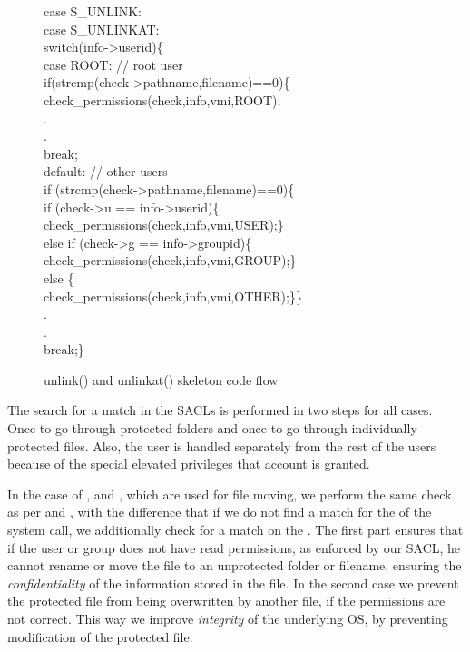 \begin{figure}[ht]
\footnotesize {
	{\selectfont 
\tab case S\_UNLINK:\\          
\tab case S\_UNLINKAT:\\
\tab \tab  switch(info->userid)\{\\
\tab \tab \tab case ROOT: // root user\\
\tab \tab \tab \tab 	if(strcmp(check->pathname,filename)==0)\{\\
\tab \tab \tab \tab \tab 		check\_permissions(check,info,vmi,ROOT);\\			
\tab \tab .\\
\tab \tab .\\
\tab \tab \tab \tab break;\\
\tab \tab \tab default: // other users\\
\tab \tab \tab \tab if (strcmp(check->pathname,filename)==0)\{\\
\tab \tab \tab \tab \tab if (check->u == info->userid)\{\\
\tab \tab \tab \tab \tab \tab check\_permissions(check,info,vmi,USER);\}\\
\tab \tab \tab \tab \tab else if (check->g == info->groupid)\{\\
\tab \tab \tab \tab \tab \tab check\_permissions(check,info,vmi,GROUP);\}\\
\tab \tab \tab \tab else \{\\
\tab \tab \tab \tab \tab check\_permissions(check,info,vmi,OTHER);\}\}\\
\tab \tab .\\
\tab \tab .\\
\tab \tab \tab \tab break;\}}}
	\caption{unlink() and unlinkat() skeleton code flow}
	\label{fig:unlink}
\end{figure}

\par The search for a match in the \ac{SACL}s is performed in two steps for all cases. Once to go through protected folders and once to go through individually protected files. Also, the  user is handled separately from the rest of the users because of the special elevated privileges that account is granted. 

\par In the case of ,  and , which are used for file moving, we perform the same check as per  and , with the difference that if we do not find a match for the  of the system call, we additionally check for a match on the . The first part ensures that if the user or group does not have read permissions, as enforced by our \ac{SACL}, he cannot rename or move the file to an unprotected folder or filename, ensuring the \emph{confidentiality} of the information stored in the file. In the second case we prevent the protected file from being overwritten by another file, if the permissions are not correct. This way we improve \emph{integrity} of the underlying \ac{OS}, by preventing modification of the protected file. 

